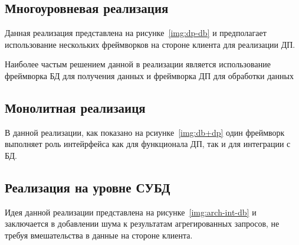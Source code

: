 
\subsection{Многоуровневая реализация}
Данная реализация представлена на рисунке~\ref{img:dp-db} и предполагает использование нескольких фреймворков на стороне клиента для реализации ДП.

Наиболее частым решением данной в реализации является использование фреймворка БД для получения данных и фреймворка ДП для обработки данных~\cite{main}


\subsection{Монолитная реализаиця}
В данной реализации, как показано на рсиунке~\ref{img:db+dp} один фреймворк выполняет роль интейрфейса как для функционала ДП, так и для интеграции с БД.


\subsection{Реализация на уровне СУБД}
Идея данной реализации представлена на рисунке~\ref{img:arch-int-db} и заключается в добавлении шума к результатам агрегированных запросов, не требуя вмешательства в данные на стороне клиента.


